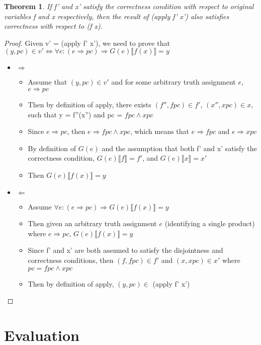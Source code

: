 \documentclass[10pt,conference]{IEEEtran}
\begin{document}
\newtheorem{th2}{Theorem}
\begin{th2}
If f' and x' satisfy the correctness condition with respect to original variables f and x respectively, then the result of (apply f' x') also satisfies correctness with respect to (f x).
\end{th2}

\begin{proof}
Given v' = (apply f' x'), we need to prove that $(y, pc) \in v' \Leftrightarrow \forall e:{(e \Rightarrow pc) \Rightarrow G(e) \llbracket f(x) \rrbracket = y}$
\begin{itemize}
\item{$\Rightarrow$}
	\begin{itemize}
	\item Assume that $(y,pc) \in v'$ and for some arbitrary truth assignment $e$, $e \Rightarrow pc$
	\item Then by definition of apply, there exists $(f'', fpc) \in f'$, $(x'', xpc) \in x$, such that y = f''(x'') and pc = $fpc \wedge xpc$
	\item Since $e \Rightarrow pc$, then $e \Rightarrow fpc \wedge xpc$, which means that $e \Rightarrow fpc$ and $e \Rightarrow xpc$
	\item By definition of $G(e)$ and the assumption that both f' and x' satisfy the correctness condition, $G(e) \llbracket f \rrbracket = f'$, and $G(e) \llbracket x \rrbracket = x'$
	\item Then $G(e) \llbracket f(x) \rrbracket = y$
	\end{itemize}
\item{$\Leftarrow$}
	\begin{itemize}
	\item Assume $\forall e:{(e \Rightarrow pc) \Rightarrow G(e) \llbracket f(x) \rrbracket = y}$
	\item Then given an arbitrary truth assignment $e$ (identifying a single product) where $e \Rightarrow pc$, $G(e) \llbracket f(x) \rrbracket = y$
	\item Since f' and x' are both assumed to satisfy the disjointness and correctness conditions, then $(f,fpc) \in f'$ and $(x,xpc) \in x'$ where $pc = fpc \wedge xpc$
	\item Then by definition of apply, $(y,pc) \in$ (apply f' x')
	\end{itemize}
\end{itemize}

\end{proof}

\section{Evaluation}
\end{document}
